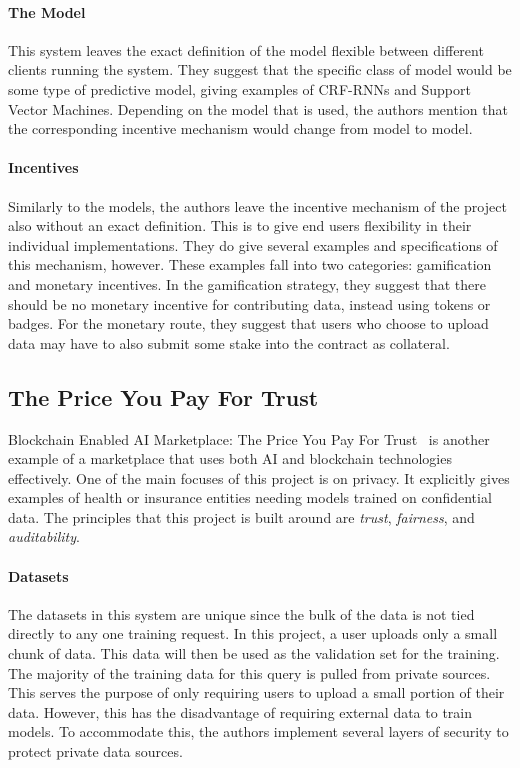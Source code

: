 \documentclass{ledger}
\begin{document}
\paragraph{The Model}
This system leaves the exact definition of the model flexible between different clients running the system.  They
suggest that the specific class of model would be some type of predictive model, giving examples of CRF-RNNs and
Support Vector Machines.  Depending on the model that is used, the authors mention that the
corresponding incentive mechanism would change from model to model.

\paragraph{Incentives}
Similarly to the models, the authors leave the incentive mechanism of the project also without an exact definition.
This is to give end users flexibility in their individual implementations.  They do give several examples and
specifications of this mechanism, however.  These examples fall into two categories: gamification and monetary
incentives.  In the gamification strategy, they suggest that there should be no monetary incentive for contributing
data, instead using tokens or badges.  For the monetary route, they suggest that users who choose to upload data may have
to also submit some stake into the contract as collateral.

\subsection{The Price You Pay For Trust}

Blockchain Enabled AI Marketplace: The Price You Pay For Trust~\cite{priceOfTrust} is another example of a marketplace
that uses both AI and blockchain technologies effectively.  One of the main focuses of this project is on privacy.
It explicitly gives examples of health or insurance entities needing models trained on confidential data.  The principles
that this project is built around are \textit{trust}, \textit{fairness}, and \textit{auditability}.

\paragraph{Datasets}
The datasets in this system are unique since the bulk of the data is not tied directly to any one training request.
In this project, a user uploads only a small chunk of data.  This data will then be used as the validation set for
the training.  The majority of the training data for this query is pulled from private sources.  This serves the purpose
of only requiring users to upload a small portion of their data.  However, this has the disadvantage of requiring
external data to train models.  To accommodate this, the authors implement several layers of security to protect private
data sources.
\end{document}
